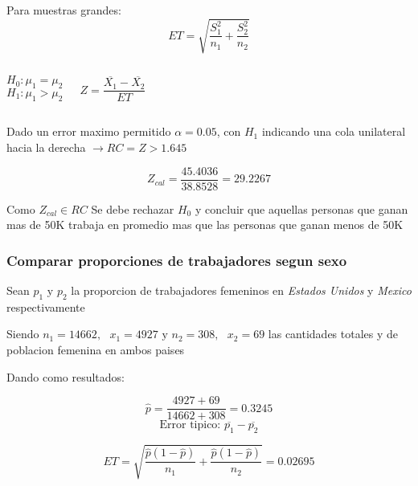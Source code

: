 \documentclass{beamer}
\begin{document}
\begin{frame}
  Para muestras grandes: \[ET = \sqrt{\frac{S_1 ^ 2}{n_1} + \frac{S_2 ^ 2}{n_2}}\]

  \begin{columns}
   \[H_0: \mu_1 = \mu_2\]
   \[H_1: \mu_1 > \mu_2\]


      \[\textit{Z} = \frac{\overline{X_1} - \overline{X_2}}{ET}\]
      \newline

  \end{columns}

  Dado un error maximo permitido $\alpha = 0.05$, con \textit{$H_1$} indicando una cola unilateral
  hacia la derecha $\rightarrow RC = {Z > 1.645}$

  \[Z_{cal} = \frac{45.4036}{38.8528} = 29.2267\]

  Como \textit{$Z_{cal} \in RC$} Se debe rechazar \textit{$H_0$} y concluir que
  aquellas personas que ganan mas de 50K trabaja en promedio mas que las personas
  que ganan menos de 50K

\end{frame}

\begin{frame}
  \frametitle{Comparar proporciones de trabajadores segun sexo}
  Sean $p_1 \textrm{ y } p_2$ la proporcion de trabajadores femeninos en \textit{Estados Unidos}
  y \textit{Mexico} respectivamente

  Siendo $n_1 = 14662,\textrm{ } x_1 = 4927 \textrm{ y } n_2 = 308, \textrm{ } x_2 = 69$ las cantidades totales
  y de poblacion femenina en ambos paises

  Dando como resultados:

  \[
    \hat{p} = \frac{4927 + 69}{14662 + 308} = 0.3245 \]
  \[
    \textrm{Error tipico: } \overline{p_1} - \overline{p_2}
  \]

  \[
    ET = \sqrt{\frac{\hat{p}(1 - \hat{p})}{n_1} + \frac{\hat{p}(1 - \hat{p})}{n_2}} = 0.02695
  \]

\end{frame}
\end{document}
